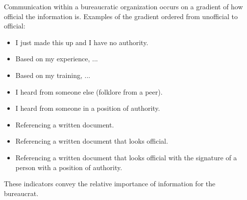 Communication within a bureaucratic organization occurs on a gradient of how official the information is. Examples of the gradient ordered from unofficial to official:
\begin{itemize}
    \item I just made this up and I have no authority.
    \item Based on my experience, ...
    \item Based on my training, ...
    \item I heard from someone else (folklore from a peer).
    \item I heard from someone in a position of authority.
    \item Referencing a written document.
    \item Referencing a written document that looks official.
    \item Referencing a written document that looks official with the signature of a person with a position of authority.
\end{itemize}
These indicators convey the relative importance of information for the bureaucrat. 
